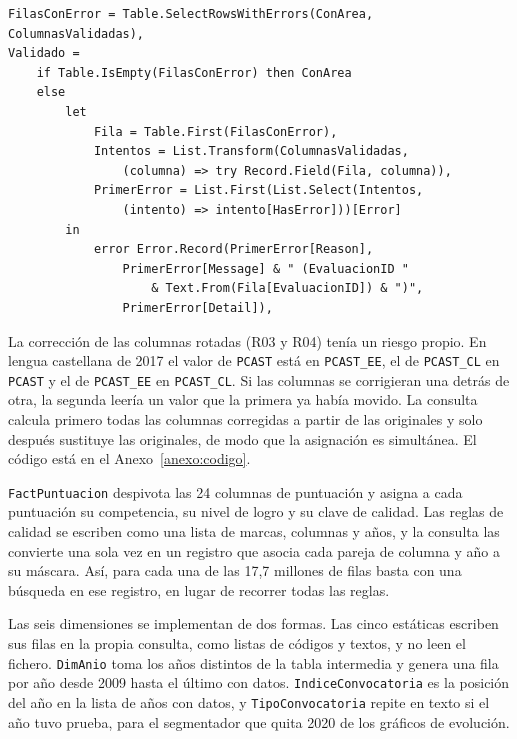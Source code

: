 \documentclass[12pt, a4paper, oneside]{report}
\begin{document}
\par\vspace{2ex}\noindent\begin{minipage}{\textwidth}\small{}
\begin{verbatim}
FilasConError = Table.SelectRowsWithErrors(ConArea, ColumnasValidadas),
Validado =
    if Table.IsEmpty(FilasConError) then ConArea
    else
        let
            Fila = Table.First(FilasConError),
            Intentos = List.Transform(ColumnasValidadas,
                (columna) => try Record.Field(Fila, columna)),
            PrimerError = List.First(List.Select(Intentos,
                (intento) => intento[HasError]))[Error]
        in
            error Error.Record(PrimerError[Reason],
                PrimerError[Message] & " (EvaluacionID "
                    & Text.From(Fila[EvaluacionID]) & ")",
                PrimerError[Detail]),
\end{verbatim}
\end{minipage}\par\vspace{2.5ex}

La corrección de las columnas rotadas (R03 y R04) tenía un riesgo propio. En lengua castellana de 2017 el valor de \texttt{PCAST} está en \texttt{PCAST\_EE}, el de \texttt{PCAST\_CL} en \texttt{PCAST} y el de \texttt{PCAST\_EE} en \texttt{PCAST\_CL}. Si las columnas se corrigieran una detrás de otra, la segunda leería un valor que la primera ya había movido. La consulta calcula primero todas las columnas corregidas a partir de las originales y solo después sustituye las originales, de modo que la asignación es simultánea. El código está en el Anexo~\ref{anexo:codigo}.

\texttt{FactPuntuacion} despivota las 24 columnas de puntuación y asigna a cada puntuación su competencia, su nivel de logro y su clave de calidad. Las reglas de calidad se escriben como una lista de marcas, columnas y años, y la consulta las convierte una sola vez en un registro que asocia cada pareja de columna y año a su máscara. Así, para cada una de las 17,7 millones de filas basta con una búsqueda en ese registro, en lugar de recorrer todas las reglas.

Las seis dimensiones se implementan de dos formas. Las cinco estáticas escriben sus filas en la propia consulta, como listas de códigos y textos, y no leen el fichero. \texttt{DimAnio} toma los años distintos de la tabla intermedia y genera una fila por año desde 2009 hasta el último con datos. \texttt{IndiceConvocatoria} es la posición del año en la lista de años con datos, y \texttt{TipoConvocatoria} repite en texto si el año tuvo prueba, para el segmentador que quita 2020 de los gráficos de evolución.
\end{document}
